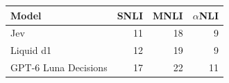 \begin{tabular}{lrrr}
\toprule
Model & SNLI & MNLI & $\alpha$NLI \\
\midrule
Jev & 11 & 18 & 9 \\
Liquid d1 & 12 & 19 & 9 \\
GPT-6 Luna Decisions & 17 & 22 & 11 \\
\bottomrule
\end{tabular}
